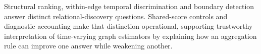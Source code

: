 Structural ranking, within-edge temporal discrimination and boundary detection
answer distinct relational-discovery questions. Shared-score controls and
diagnostic accounting make that distinction operational, supporting trustworthy
interpretation of time-varying graph estimators by explaining how an aggregation
rule can improve one answer while weakening another.

